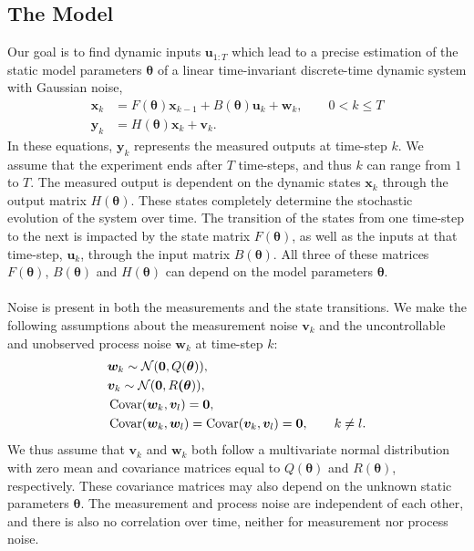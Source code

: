 \subsection{The Model}
Our goal is to find dynamic inputs $\bm  u_{1:T}$ which lead to a precise estimation of the static model parameters $\bm  \theta$ of a linear time-invariant discrete-time dynamic system with Gaussian noise,
\begin{equation}
\begin{aligned}
\bm x_{k} &= F(\bm \theta)\bm x_{k-1} + B(\bm \theta)\bm u_k + \bm w_k,
\qquad 0<k\leq T \\ 
\bm y_k &= H(\bm \theta)\bm x_k + \bm v_k.
\end{aligned}
\label{system}
\end{equation}
In these equations, $\bm  y_k$ represents the measured outputs at time-step $k$. We assume that the experiment ends after $T$ time-steps, and thus $k$ can range from $1$ to $T$. The measured output is dependent on the dynamic states $\bm  x_k$ through the output matrix $H(\bm \theta)$. These states completely determine the stochastic evolution of the system over time. The transition of the states from one time-step to the next is impacted by the state matrix $F(\bm \theta)$, as well as the inputs at that time-step, $\bm  u_k$, through the input matrix $B(\bm \theta)$. All three of these matrices $F(\bm \theta)$, $B(\bm \theta)$ and $H(\bm \theta)$  can depend on the model parameters $\bm \theta$.
\\
\\
Noise is present in both the measurements and the state transitions. We make the following assumptions about the measurement noise $\bm v_k$ and the {\color{red}uncontrollable and unobserved} process noise $\bm w_k$ at time-step $k$:
\begin{equation}
\begin{aligned}
& \bm w_k \sim \mathcal{N}(\bm 0,Q(\bm \theta)),\\
& \bm v_k \sim \mathcal{N}(\bm 0,R\bm (\bm \theta)),\\
&\operatorname{\mathrm{Covar}}(\bm w_k,\bm v_l) = \bm 0,\\
&\operatorname{\mathrm{Covar}}(\bm w_k,\bm w_l) = \operatorname{\mathrm{Covar}}(\bm v_k,\bm v_l) = \bm 0, \qquad k\ne l.\\
\end{aligned}
\end{equation}
We thus assume that $\bm v_k$ and $\bm w_k$ both follow a multivariate normal distribution with zero mean and covariance matrices equal to $Q(\bm \theta)$ and $R(\bm \theta)$, respectively. These covariance matrices may also depend on the unknown static parameters $\bm \theta$. The measurement and process noise are independent of each other, and there is also no correlation over time, neither for measurement nor process noise. 
